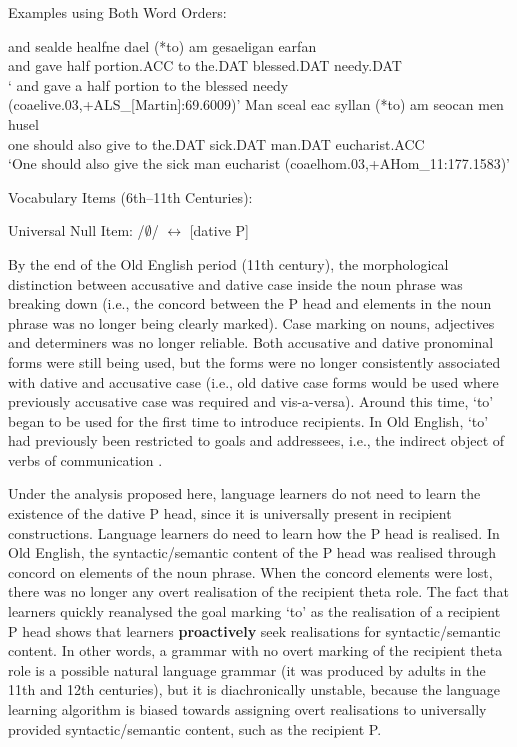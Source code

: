 	\begin{exe}
		\ex Examples using Both Word Orders:
		\begin{xlist}
			\ex \gll and sealde healfne dael (*to) \TH am gesaeligan \TH earfan\\
			and gave half portion.ACC to the.DAT blessed.DAT needy.DAT\\
			\trans ` and gave a half portion to the blessed needy (coaelive.03,+ALS\_[Martin]:69.6009)'
			\ex \gll Man sceal eac syllan (*to) \TH am seocan men husel\\
			one should also give to the.DAT sick.DAT man.DAT eucharist.ACC\\
			\trans `One should also give the sick man eucharist (coaelhom.03,+AHom\_11:177.1583)'
		\end{xlist}
		\ex Vocabulary Items (6th--11th Centuries):\label{ex:old-eng-vi}
		\begin{xlist}
			\ex Universal Null Item:  /$\emptyset$/ $\leftrightarrow$ [dative P]
		\end{xlist}
	\end{exe}
	
	By the end of the Old English period (11th century), the morphological distinction between accusative and dative case inside the noun phrase was breaking down (i.e., the concord between the P head and elements in the noun phrase was no longer being clearly marked). Case marking on nouns, adjectives and determiners was no longer reliable. Both accusative and dative pronominal forms were still being used, but the forms were no longer consistently associated with dative and accusative case (i.e., old dative case forms would be used where previously accusative case was required and vis-a-versa). Around this time, `to' began to be used for the first time to introduce recipients. In Old English, `to' had previously been restricted to goals and addressees, i.e., the indirect object of verbs of communication \citep{Allen.1999,McFadden.2002,OED.2013}. 
	
	Under the analysis proposed here, language learners do not need to learn the existence of the dative P head, since it is universally present in recipient constructions. Language learners do need to learn how the P head is realised. In Old English, the syntactic/semantic content of the P head was realised through concord on elements of the noun phrase. When the concord elements were lost, there was no longer any overt realisation of the recipient theta role. The fact that learners quickly reanalysed the goal marking `to' as the realisation of a recipient P head shows that learners \textbf{proactively} seek realisations for syntactic/semantic content. In other words, a grammar with no overt marking of the recipient theta role is a possible natural language grammar (it was produced by adults in the 11th and 12th centuries), but it is diachronically unstable, because the language learning algorithm is biased towards assigning overt realisations to universally provided syntactic/semantic content, such as the recipient P.

